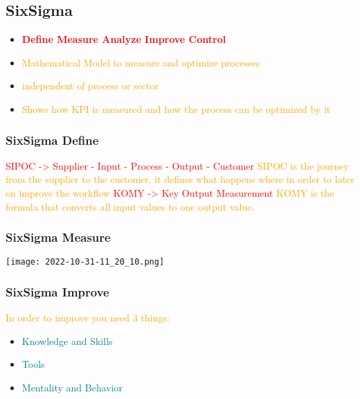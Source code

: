 \documentclass[main.tex,fontsize=12pt,paper=a4,paper=landscape,DIV=calc,]{scrartcl}
\begin{document}
\begin{multicols*}{2}
\subsection{SixSigma} 
\begin{itemize}
\item \textcolor{red}{\textbf{Define Measure Analyze Improve Control}}
\item \textcolor{orange}{Mathematical Model to measure and optimize processes}
\item \textcolor{orange}{independent of process or sector}
\item \textcolor{orange}{Shows how KPI is measured and how the process can be optimized by it}
\end{itemize}

\subsubsection{SixSigma Define}
\textcolor{red}{SIPOC -> Supplier - Input - Process - Output - Customer}\newline
\textcolor{orange}{SIPOC is the journey from the supplier to the customer, \newline
it defines what happens where in order to later on improve the workflow}\newline
\textcolor{red}{KOMY -> Key Output Measurement}\newline
\textcolor{orange}{KOMY is the formula that converts all input values to one output value.}

\subsubsection{SixSigma Measure} 
\texttt{[image: 2022-10-31-11\_20\_10.png]}

\subsubsection{SixSigma Improve} 
\textcolor{orange}{In order to improve you need 3 things:}\newline
\begin{itemize}
\item \textcolor{teal}{Knowledge and Skills}
\item \textcolor{teal}{Tools}
\item \textcolor{teal}{Mentality and Behavior}
\end{itemize}


\end{multicols*}
\end{document}
